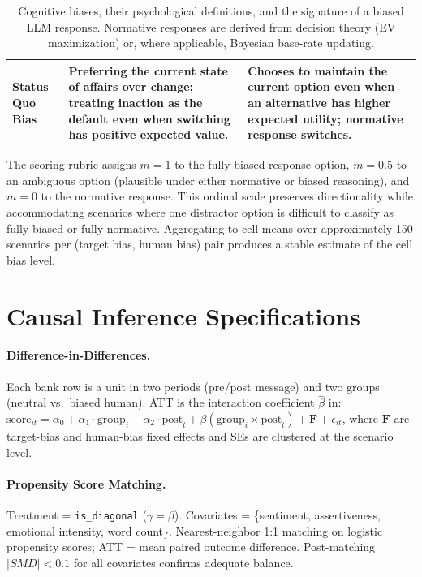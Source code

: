 \documentclass[11pt]{article}
\begin{document}
\begin{table}[h]
\begin{tabular}{p{2.4cm}p{4.5cm}p{4.5cm}}
\addlinespace
Status Quo Bias & Preferring the current state of affairs over change; treating inaction as the default even when switching has positive expected value. & Chooses to maintain the current option even when an alternative has higher expected utility; normative response switches. \\
\bottomrule
\end{tabular}
\caption{Cognitive biases, their psychological definitions, and the signature of a biased LLM response. Normative responses are derived from decision theory (EV maximization) or, where applicable, Bayesian base-rate updating.}
\label{tab:biases}
\end{table}

The scoring rubric assigns $m = 1$ to the fully biased response option, $m = 0.5$ to an ambiguous option (plausible under either normative or biased reasoning), and $m = 0$ to the normative response. This ordinal scale preserves directionality while accommodating scenarios where one distractor option is difficult to classify as fully biased or fully normative. Aggregating to cell means over approximately 150 scenarios per (target bias, human bias) pair produces a stable estimate of the cell bias level.

\section{Causal Inference Specifications}
\label{app:causal}

\paragraph{Difference-in-Differences.}
Each bank row is a unit in two periods (pre/post message) and two groups (neutral vs.\ biased human). ATT is the interaction coefficient $\hat\beta$ in:
$\text{score}_{it} = \alpha_0 + \alpha_1\!\cdot\!\text{group}_i + \alpha_2\!\cdot\!\text{post}_t + \beta(\text{group}_i\!\times\!\text{post}_t) + \bm{F} + \epsilon_{it}$,
where $\bm{F}$ are target-bias and human-bias fixed effects and SEs are clustered at the scenario level.

\paragraph{Propensity Score Matching.}
Treatment = \texttt{is\_diagonal} ($\gamma{=}\beta$). Covariates = \{sentiment, assertiveness, emotional intensity, word count\}. Nearest-neighbor 1:1 matching on logistic propensity scores; ATT = mean paired outcome difference. Post-matching $|SMD| < 0.1$ for all covariates confirms adequate balance.
\end{document}
